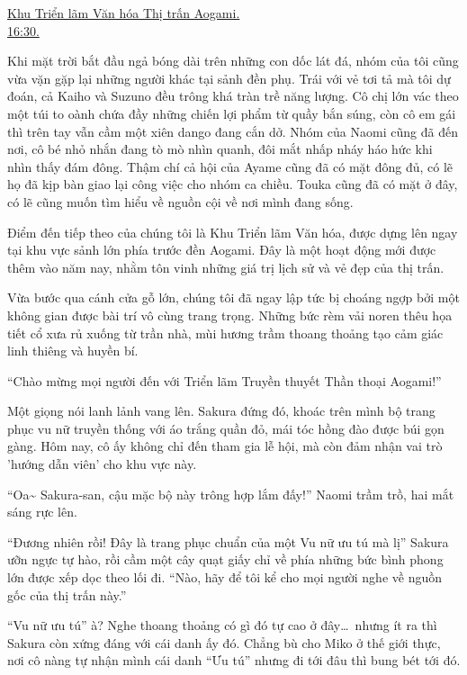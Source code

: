 \documentclass[../main.tex]{subfiles}
\begin{document}
\ct

\begin{center}
  \uline{Khu Triển lãm Văn hóa Thị trấn Aogami.\\16:30.}
\end{center}

Khi mặt trời bắt đầu ngả bóng dài trên những con dốc lát đá, nhóm của tôi cũng vừa vặn gặp lại những người khác tại sảnh đền phụ. Trái với vẻ tơi tả mà tôi dự đoán, cả Kaiho và Suzuno đều trông khá tràn trề năng lượng. Cô chị lớn vác theo một túi to oành chứa đầy những chiến lợi phẩm từ quầy bắn súng, còn cô em gái thì trên tay vẫn cầm một xiên dango đang cắn dở. Nhóm của Naomi cũng đã đến nơi, cô bé nhỏ nhắn đang tò mò nhìn quanh, đôi mắt nhấp nháy háo hức khi nhìn thấy đám đông. Thậm chí cả hội của Ayame cũng đã có mặt đông đủ, có lẽ họ đã kịp bàn giao lại công việc cho nhóm ca chiều. Touka cũng đã có mặt ở đây, có lẽ cũng muốn tìm hiểu về nguồn cội về nơi mình đang sống.

Điểm đến tiếp theo của chúng tôi là Khu Triển lãm Văn hóa, được dựng lên ngay tại khu vực sảnh lớn phía trước đền Aogami. Đây là một hoạt động mới được thêm vào năm nay, nhằm tôn vinh những giá trị lịch sử và vẻ đẹp của thị trấn.

Vừa bước qua cánh cửa gỗ lớn, chúng tôi đã ngay lập tức bị choáng ngợp bởi một không gian được bài trí vô cùng trang trọng. Những bức rèm vải noren thêu họa tiết cổ xưa rủ xuống từ trần nhà, mùi hương trầm thoang thoảng tạo cảm giác linh thiêng và huyền bí.

``Chào mừng mọi người đến với Triển lãm Truyền thuyết Thần thoại Aogami!''

Một giọng nói lanh lảnh vang lên. Sakura đứng đó, khoác trên mình bộ trang phục vu nữ truyền thống với áo trắng quần đỏ, mái tóc hồng đào được búi gọn gàng. Hôm nay, cô ấy không chỉ đến tham gia lễ hội, mà còn đảm nhận vai trò 'hướng dẫn viên' cho khu vực này.

``Oa\~{} Sakura-san, cậu mặc bộ này trông hợp lắm đấy!'' Naomi trầm trồ, hai mắt sáng rực lên.

``Đương nhiên rồi! Đây là trang phục chuẩn của một Vu nữ ưu tú mà lị'' Sakura ưỡn ngực tự hào, rồi cầm một cây quạt giấy chỉ về phía những bức bình phong lớn được xếp dọc theo lối đi. ``Nào, hãy để tôi kể cho mọi người nghe về nguồn gốc của thị trấn này.''

``Vu nữ ưu tú'' à? Nghe thoang thoảng có gì đó tự cao ở đây\dots\ nhưng ít ra thì Sakura còn xứng đáng với cái danh ấy đó. Chẳng bù cho Miko ở thế giới thực, nơi cô nàng tự nhận mình cái danh ``Ưu tú'' nhưng đi tới đâu thì bung bét tới đó.
\end{document}
